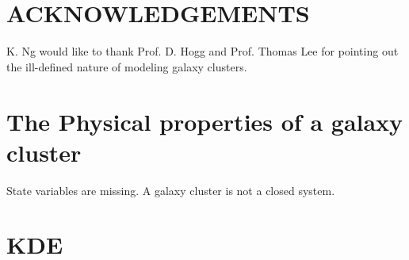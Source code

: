 \documentclass[usenatbib]{mn2e}
\begin{document}
\section{ACKNOWLEDGEMENTS}
K. Ng would like to thank Prof. D. Hogg and Prof. Thomas Lee for pointing out the ill-defined nature of
modeling galaxy clusters.

\appendix 
\section{The Physical properties of a galaxy cluster}
State variables are missing.
A galaxy cluster is not a closed system. 






\appendix
\section{KDE}
\clearpage\bsp\label{lastpage} 
\end{document}
